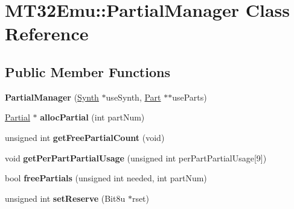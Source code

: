 \hypertarget{classMT32Emu_1_1PartialManager}{\section{M\-T32\-Emu\-:\-:Partial\-Manager Class Reference}
\label{classMT32Emu_1_1PartialManager}
}
\subsection*{Public Member Functions}
\begin{DoxyCompactItemize}
\item 
\hypertarget{classMT32Emu_1_1PartialManager_a879834192d9932cb907dec0bd87c7382}{{\bfseries Partial\-Manager} (\hyperlink{classMT32Emu_1_1Synth}{Synth} $\ast$use\-Synth, \hyperlink{classMT32Emu_1_1Part}{Part} $\ast$$\ast$use\-Parts)}\label{classMT32Emu_1_1PartialManager_a879834192d9932cb907dec0bd87c7382}

\item 
\hypertarget{classMT32Emu_1_1PartialManager_a0b5eedfd5d38c462bb9da43984644b8a}{\hyperlink{classMT32Emu_1_1Partial}{Partial} $\ast$ {\bfseries alloc\-Partial} (int part\-Num)}\label{classMT32Emu_1_1PartialManager_a0b5eedfd5d38c462bb9da43984644b8a}

\item 
\hypertarget{classMT32Emu_1_1PartialManager_a0cc93f84577d59bf7a47456bfbf17863}{unsigned int {\bfseries get\-Free\-Partial\-Count} (void)}\label{classMT32Emu_1_1PartialManager_a0cc93f84577d59bf7a47456bfbf17863}

\item 
\hypertarget{classMT32Emu_1_1PartialManager_a0e91738af9fa8513ef30257755399ea1}{void {\bfseries get\-Per\-Part\-Partial\-Usage} (unsigned int per\-Part\-Partial\-Usage\mbox{[}9\mbox{]})}\label{classMT32Emu_1_1PartialManager_a0e91738af9fa8513ef30257755399ea1}

\item 
\hypertarget{classMT32Emu_1_1PartialManager_a7fa1cc60f54e1a23e6e8797d1d91ce8a}{bool {\bfseries free\-Partials} (unsigned int needed, int part\-Num)}\label{classMT32Emu_1_1PartialManager_a7fa1cc60f54e1a23e6e8797d1d91ce8a}

\item 
\hypertarget{classMT32Emu_1_1PartialManager_ae7ab34361f1734a467e9740dfe9dd9e3}{unsigned int {\bfseries set\-Reserve} (Bit8u $\ast$rset)}\label{classMT32Emu_1_1PartialManager_ae7ab34361f1734a467e9740dfe9dd9e3}


\end{DoxyCompactItemize}
